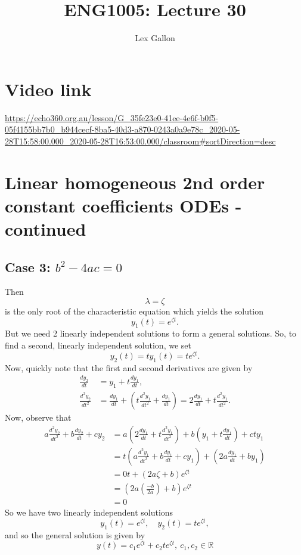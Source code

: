\documentclass[11pt]{article}
\newcommand{\reals}{\mathbb{R}}
\begin{document}
\title{ENG1005: Lecture 30}
\author{Lex Gallon}
\maketitle

\tableofcontents

\section*{Video link}
\url{https://echo360.org.au/lesson/G_35fe23e0-41ee-4e6f-b0f5-05f4155bb7b0_b944cecf-8ba5-40d3-a870-0243a0a9e78c_2020-05-28T15:58:00.000_2020-05-28T16:53:00.000/classroom#sortDirection=desc}

\section{Linear homogeneous 2nd order constant coefficients ODEs - continued}
\subsection*{Case 3: $b^2 - 4ac = 0$}
Then
\[ \lambda = \zeta \]
is the only root of the characteristic equation which yields the solution
\[ y_1(t) = e^{\zeta t}. \]
But we need 2 linearly independent solutions to form a general solutions. So, to find a second, linearly independent solution, we set
\[ y_2(t) = t y_1(t) = t e^{\zeta t}. \]
Now, quickly note that the first and second derivatives are given by
\begin{align*}
\frac{dy_2}{dt} &= y_1 + t \frac{dy_1}{dt}, \\
\frac{d^2 y_2}{dt^2} &= \frac{dy_1}{dt} + \left( t\frac{d^2 y_1}{dt^2} +  \frac{dy_1}{dt} \right) = 2 \frac{dy_1}{dt} + t \frac{d^2 y_1}{dt^2}.
\end{align*}
Now, observe that
\begin{align*}
a \frac{d^2 y_2}{dt^2} + b \frac{dy_2}{dt} + c y_2 &= a \left( 2 \frac{dy_1}{dt} + t \frac{d^2 y_1}{dt^2} \right) + b \left( y_1 + t \frac{dy_1}{dt} \right) + cty_1 \\
&= t \left( a \frac{d^2 y_1}{dt^2} + b \frac{dy_1}{dt} + cy_1 \right) + \left( 2a \frac{dy_1}{dt} + by_1 \right) \\
&= 0t + (2a \zeta + b)e^{\zeta t} \\
&= \left( 2a \left( \frac{-b}{2a} \right) + b \right)e^{\zeta t} \\
&= 0
\end{align*}
So we have two linearly independent solutions
\[ y_1(t) = e^{\zeta t},\quad y_2(t) = te^{\zeta t}, \]
and so the general solution is given by
\[ y(t) = c_1 e^{\zeta t} + c_2 t e^{\zeta t},\ c_1, c_2 \in \reals \]
\end{document}
